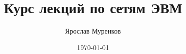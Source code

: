 \documentclass[a5paper,14pt]{report}
\author{Ярослав Муренков}
\title{Курс лекций по сетям ЭВМ}
\date{\today}
\begin{document}


\begin{comment}














\end{comment}
\end{document}
